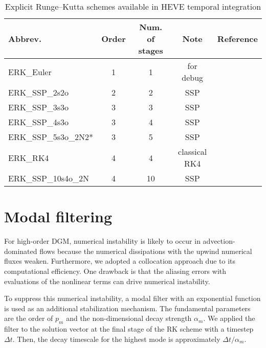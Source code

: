 \begin{table}[t]
\caption{Explicit Runge--Kutta schemes available in HEVE temporal integration}
\begin{tabular}{l|cccc}
\hline
Abbrev. & Order & Num. of stages & Note & Reference \\
\hline
ERK\_Euler & 1 & 1 & for debug & \\
\hline
ERK\_SSP\_2s2o & 2 & 2 & SSP & \cite{SHU1988439} \\
\hline
ERK\_SSP\_3s3o & 3 & 3 & SSP & \cite{SHU1988439} \\
ERK\_SSP\_4s3o & 3 & 4 & SSP & \\
ERK\_SSP\_5s3o\_2N2* & 3 & 5 & SSP & \cite{higueras2019new} \\
\hline
ERK\_RK4 & 4 & 4 & classical RK4 & \\
ERK\_SSP\_10s4o\_2N & 4 & 10 & SSP & \cite{Ketcheson2008RK4o10s} \\
\hline
\end{tabular}
\label{tb:HEVE_temporal_integ_choice}
\end{table}

\section{Modal filtering} \label{sec:modal_filter}

For high-order DGM, 
numerical instability is likely to occur in advection-dominated flows 
because the numerical dissipations with the upwind numerical fluxes weaken. 
Furthermore, 
we adopted a collocation approach due to its computational efficiency. 
One drawback is that 
the aliasing errors with evaluations of the nonlinear terms can drive numerical instability. 

To suppress this numerical instability, 
a modal filter with an exponential function is used as an additional stabilization mechanism. 
The fundamental parameters are the order of $p_m$ and the non-dimensional decay strength $\alpha_m$. 
We applied the filter to the solution vector 
at the final stage of the RK scheme with a timestep $\Delta t$. 
Then, the decay timescale for the highest mode is approximately $\Delta t/\alpha_m$.


